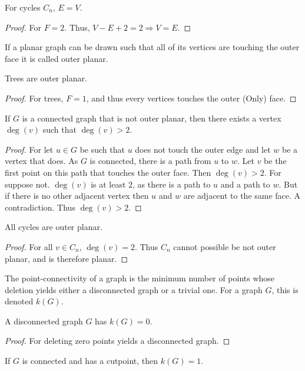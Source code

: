 \documentclass[crop=false,class=book]{standalone}
\begin{document}
\begin{corollary}
For cycles $C_n$, $E=V$.
\end{corollary}
\begin{proof}
For $F=2$. Thus, $V-E+2=2\Rightarrow V=E$.
\end{proof}
\begin{definition}
If a planar graph can be drawn such that all of its vertices are touching the outer face it is called outer planar.
\end{definition}
\begin{corollary}
Trees are outer planar.
\end{corollary}
\begin{proof}
For trees, $F=1$, and thus every vertices touches the outer (Only) face.
\end{proof}
\begin{lemma}
If $G$ is a connected graph that is not outer planar, then there exists a vertex $\deg(v)$ such that $\deg(v)>2$.
\end{lemma}
\begin{proof}
For let $u \in G$ be such that $u$ does not touch the outer edge and let $w$ be a vertex that does. As $G$ is connected, there is a path from $u$ to $w$. Let $v$ be the first point on this path that touches the outer face. Then $\deg(v)>2$. For suppose not. $\deg(v)$ is at least $2$, as there is a path to $u$ and a path to $w$. But if there is no other adjacent vertex then $u$ and $w$ are adjacent to the same face. A contradiction. Thus $\deg(v)>2$.
\end{proof}
\begin{corollary}
All cycles are outer planar.
\end{corollary}
\begin{proof}
For all $v\in C_n$, $\deg(v)=2$. Thus $C_n$ cannot possible be not outer planar, and is therefore planar.
\end{proof}
\begin{definition}
The point-connectivity of a graph is the minimum number of points whose deletion yields either a disconnected graph or a trivial one. For a graph $G$, this is denoted $k(G)$.
\end{definition}
\begin{corollary}
A disconnected graph $G$ has $k(G) = 0$.
\end{corollary}
\begin{proof}
For deleting zero points yields a disconnected graph.
\end{proof}
\begin{corollary}
If $G$ is connected and has a cutpoint, then $k(G) = 1$.
\end{corollary}
\end{document}

